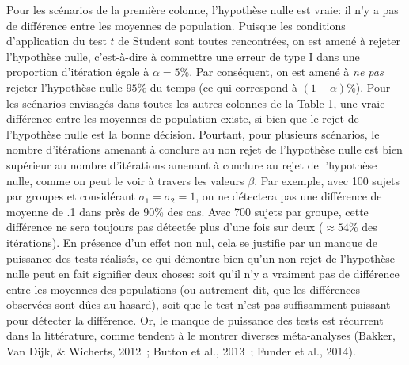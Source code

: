 \documentclass[
  12pt,
  french,
]{article}
\begin{document}
Pour les scénarios de la première colonne, l'hypothèse nulle est vraie:
il n'y a pas de différence entre les moyennes de population. Puisque les
conditions d'application du test \(t\) de Student sont toutes
rencontrées, on est amené à rejeter l'hypothèse nulle, c'est-à-dire à
commettre une erreur de type I dans une proportion d'itération égale à
\(\alpha = 5\%\). Par conséquent, on est amené à \emph{ne pas} rejeter
l'hypothèse nulle \(95\%\) du temps (ce qui correspond à
\((1-\alpha)\%\)).
Pour les scénarios envisagés dans toutes les autres colonnes de la Table
1, une vraie différence entre les moyennes de population existe, si bien
que le rejet de l'hypothèse nulle est la bonne décision. Pourtant, pour
plusieurs scénarios, le nombre d'itérations amenant à conclure au non
rejet de l'hypothèse nulle est bien supérieur au nombre d'itérations
amenant à conclure au rejet de l'hypothèse nulle, comme on peut le voir
à travers les valeurs \(\beta\). Par exemple, avec 100 sujets par
groupes et considérant \(\sigma_1=\sigma_2=1\), on ne détectera pas une
différence de moyenne de .1 dans près de 90\% des cas. Avec 700 sujets
par groupe, cette différence ne sera toujours pas détectée plus d'une
fois sur deux (\(\approx 54 \%\) des itérations). En présence d'un effet
non nul, cela se justifie par un manque de puissance des tests réalisés,
ce qui démontre bien qu'un non rejet de l'hypothèse nulle peut en fait
signifier deux choses: soit qu'il n'y a vraiment pas de différence entre
les moyennes des populations (ou autrement dit, que les différences
observées sont dûes au hasard), soit que le test n'est pas suffisamment
puissant pour détecter la différence. Or, le manque de puissance des
tests est récurrent dans la littérature, comme tendent à le montrer
diverses méta-analyses (Bakker, Van Dijk, \& Wicherts, 2012~; Button et
al., 2013~; Funder et al., 2014).
\end{document}
